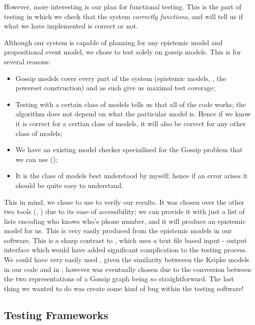 \documentclass[12pt, a4paper]{article}
\begin{document}
\bigskip

However, more interesting is our plan for functional testing. This is the part
of testing in which we check that the system \textit{correctly functions}, and
will tell us if what we have implemented is correct or not.

Although our system is capable of planning for any epistemic model and
propositional event model, we chose to test solely on gossip models. This is
for several reasons:

\begin{itemize}
\item Gossip models cover every part of the system (epistemic models, \mestar,
  the powerset construction) and as such give us maximal test coverage;
\item Testing with a certain class of models tells us that all of the code
  works; the algorithm does not depend on what the particular model is. Hence if
  we know it is correct for a certian class of models, it will also be correct
  for any other class of models;
\item We have an existing model checker speciailised for the Gossip problem that we can use
  (\cite{GithubGossip});
\item It is the class of models best understood by myself; hence if an error
  arises it should be quite easy to understand. 
\end{itemize}

This in mind, we chose to use \cite{GithubGossip} to verify our results. It was
chosen over the other two tools (\cite{SMCDEL}, \cite{DEMO-S5}) due to its ease
of accessibility; we can provide it with just a list of lists encoding who knows
who's phone number, and it will produce an epistemic model for us. This is very
easily produced from the epistemic models in our software. This is a sharp
contrast to \cite{SMCDEL}, which uses a text file based input - output interface
which would have added significant complication to the testing process. We could
have very easily used \cite{DEMO-S5}, given the similarity betweeen the Kripke
models in our code and in \cite{DEMO-S5}, however \cite{GithubGossip} was
eventually chosen due to the conversion between the two representations of a
Gossip graph being so straightforward. The last thing we wanted to do was create
some kind of bug within the testing software!

\subsection{Testing Frameworks}
\label{sec:TestingFrameworks}
\end{document}
